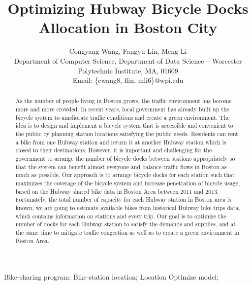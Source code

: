 \documentclass[journal, letterpaper]{IEEEtran}
\begin{document}
\title{Optimizing Hubway Bicycle Docks Allocation in Boston City}
\author{Congyang Wang, Fangyu Lin, Meng Li \\ Department of Computer Science, Department of Data Science -- Worcester Polytechnic Institute, MA, 01609 \\ Email: \{cwang8, flin, mli6\}@wpi.edu}
\maketitle

\begin{abstract} 
\large As the number of people living in Boston grows, the traffic environment has become more and more crowded. In recent years, local government has already built up the bicycle system to ameliorate traffic conditions and create a green environment. The idea is to design and implement a bicycle system that is accessible and convenient to the public by planning station locations satisfying the public needs. Residents can rent a bike from one Hubway station and return it at another Hubway station which is closed to their destinations. However, it is important and challenging for the government to arrange the number of bicycle docks between stations appropriately so that the system can benefit almost everyone and balance traffic flows in Boston as much as possible. Our approach is to arrange bicycle docks for each station such that maximizes the coverage of the bicycle system and increase penetration of bicycle usage, based on the Hubway shared bike data in Boston Area between 2011 and 2013. Fortunately, the total number of capacity for each Hubway station in Boston area is known, we are going to estimate available bikes from historical Hubway bike trips data, which contains information on stations and every trip. Our goal is to optimize the number of docks for each Hubway station to satisfy the demands and supplies, and at the same time to mitigate traffic congestion as well as to create a green environment in Boston Area. 
\end{abstract}

\begin{IEEEkeywords}
Bike-sharing program;
Bike-station location;
Location Optimize model;
\end{IEEEkeywords}
\end{document}
